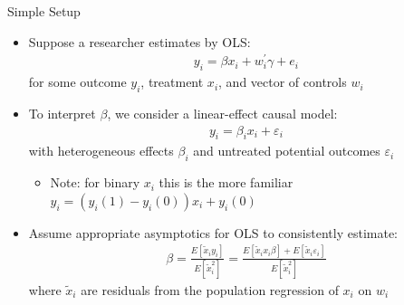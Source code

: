 \documentclass[11pt,english]{beamer}
\begin{document}
\begin{frame}{Simple Setup}
\begin{itemize}
\item Suppose a researcher estimates by OLS:
\begin{align*}
y_i=\beta x_i + w_i^\prime \gamma + e_i
\end{align*}
for some outcome $y_i$, treatment $x_i$, and vector of controls $w_i$\bigskip\pause{}
\item To interpret $\beta$, we consider a linear-effect causal model:
\begin{align*}
y_i = \beta_i x_i + \varepsilon_i
\end{align*}
with heterogeneous effects $\beta_i$ and untreated potential outcomes $\varepsilon_i$\smallskip
\begin{itemize}
\item Note: for binary $x_i$ this is the more familiar $y_i=(y_i(1)-y_i(0))x_i + y_i(0)$
\end{itemize}\medskip\pause{}
\item Assume appropriate asymptotics for OLS to consistently estimate:
\begin{align*}
\beta = \frac{E[\tilde{x}_i y_i]}{E[\tilde{x}_i^2]}=\frac{E[\tilde{x}_i x_i\beta]+E[\tilde{x}_i\varepsilon_i]}{E[\tilde{x}_i^2]}
\end{align*}
where $\tilde{x}_i$ are residuals from the population regression of $x_i$ on $w_i$
\end{itemize}
\end{frame}
\end{document}
